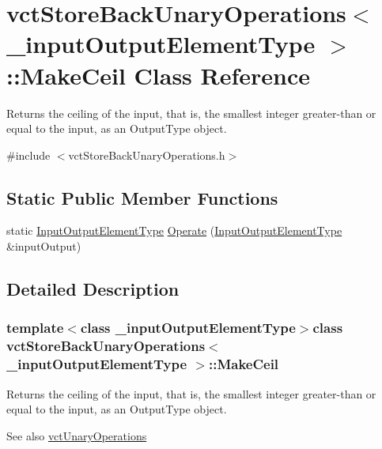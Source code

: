 \hypertarget{classvct_store_back_unary_operations_1_1_make_ceil}{}\section{vct\+Store\+Back\+Unary\+Operations$<$ \+\_\+input\+Output\+Element\+Type $>$\+:\+:Make\+Ceil Class Reference}
\label{classvct_store_back_unary_operations_1_1_make_ceil}


Returns the ceiling of the input, that is, the smallest integer greater-\/than or equal to the input, as an Output\+Type object.  




{\ttfamily \#include $<$vct\+Store\+Back\+Unary\+Operations.\+h$>$}

\subsection*{Static Public Member Functions}
\begin{DoxyCompactItemize}
\item 
static \hyperlink{classvct_store_back_unary_operations_a8af17faaa73a8d090094d468eee32062}{Input\+Output\+Element\+Type} \hyperlink{classvct_store_back_unary_operations_1_1_make_ceil_a8a57aaf0abb59856b5ef4579de93aa78}{Operate} (\hyperlink{classvct_store_back_unary_operations_a8af17faaa73a8d090094d468eee32062}{Input\+Output\+Element\+Type} \&input\+Output)
\end{DoxyCompactItemize}


\subsection{Detailed Description}
\subsubsection*{template$<$class \+\_\+input\+Output\+Element\+Type$>$class vct\+Store\+Back\+Unary\+Operations$<$ \+\_\+input\+Output\+Element\+Type $>$\+::\+Make\+Ceil}

Returns the ceiling of the input, that is, the smallest integer greater-\/than or equal to the input, as an Output\+Type object. 

\begin{DoxySeeAlso}{See also}
\hyperlink{classvct_unary_operations}{vct\+Unary\+Operations} 
\end{DoxySeeAlso}


